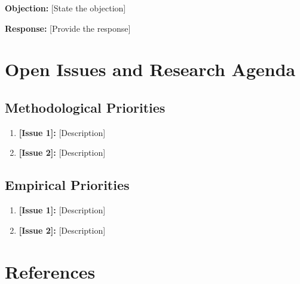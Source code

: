 \textbf{Objection:} [State the objection]

\textbf{Response:} [Provide the response]


\section{Open Issues and Research Agenda}
\label{sec:[code]-open}

\subsection{Methodological Priorities}

\begin{enumerate}
    \item \textbf{[Issue 1]:} [Description]
    \item \textbf{[Issue 2]:} [Description]
\end{enumerate}

\subsection{Empirical Priorities}

\begin{enumerate}
    \item \textbf{[Issue 1]:} [Description]
    \item \textbf{[Issue 2]:} [Description]
\end{enumerate}


\section{References}
\label{sec:[code]-references}

%
%
%
%

